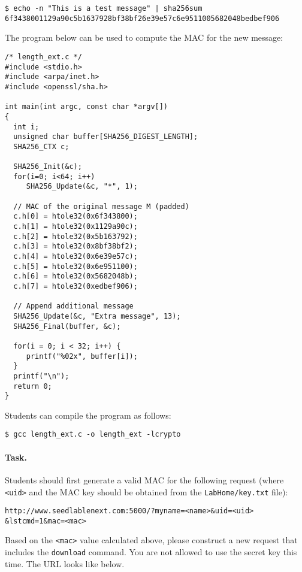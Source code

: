 \begin{lstlisting}
$ echo -n "This is a test message" | sha256sum
6f3438001129a90c5b1637928bf38bf26e39e57c6e9511005682048bedbef906
\end{lstlisting}

The program below can be used to compute the MAC for the 
new message: 

\begin{lstlisting}[escapechar=|]
/* length_ext.c */
#include <stdio.h>
#include <arpa/inet.h>
#include <openssl/sha.h>

int main(int argc, const char *argv[])
{
  int i;
  unsigned char buffer[SHA256_DIGEST_LENGTH];
  SHA256_CTX c;
  
  SHA256_Init(&c);
  for(i=0; i<64; i++)
     SHA256_Update(&c, "*", 1);
  
  // MAC of the original message M (padded)
  c.h[0] = htole32(0x6f343800);
  c.h[1] = htole32(0x1129a90c);
  c.h[2] = htole32(0x5b163792);
  c.h[3] = htole32(0x8bf38bf2);
  c.h[4] = htole32(0x6e39e57c);	
  c.h[5] = htole32(0x6e951100);
  c.h[6] = htole32(0x5682048b);	
  c.h[7] = htole32(0xedbef906);
  
  // Append additional message
  SHA256_Update(&c, "Extra message", 13); 
  SHA256_Final(buffer, &c);

  for(i = 0; i < 32; i++) {
     printf("%02x", buffer[i]);
  }	 
  printf("\n");
  return 0;
}
\end{lstlisting}

Students can compile the program as follows:

\begin{lstlisting}
$ gcc length_ext.c -o length_ext -lcrypto
\end{lstlisting}

\paragraph{Task.} Students should first generate a valid MAC for the
following request (where \texttt{<uid>} and the MAC key should be 
obtained from the \texttt{LabHome/key.txt} file): 

\begin{lstlisting}
http://www.seedlablenext.com:5000/?myname=<name>&uid=<uid>
&lstcmd=1&mac=<mac>
\end{lstlisting}

Based on the \texttt{<mac>} value calculated above, please construct 
a new request that includes the \texttt{download} command. You are not allowed to use the secret key this time.  The URL looks like below.

